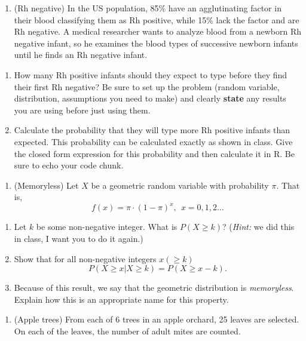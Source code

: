 \documentclass[
]{article}
\providecommand{\tightlist}{%
  \setlength{\itemsep}{0pt}\setlength{\parskip}{0pt}}
\begin{document}
\begin{enumerate}
\def\labelenumi{\arabic{enumi}.}
\setcounter{enumi}{1}
\tightlist
\item
  (Rh negative) In the US population, 85\% have an agglutinating factor
  in their blood classifying them as Rh positive, while 15\% lack the
  factor and are Rh negative. A medical researcher wants to analyze
  blood from a newborn Rh negative infant, so he examines the blood
  types of successive newborn infants until he finds an Rh negative
  infant.
\end{enumerate}

\begin{enumerate}
\def\labelenumi{\alph{enumi}.}
\item
  How many Rh positive infants should they expect to type before they
  find their first Rh negative? Be sure to set up the problem (random
  variable, distribution, assumptions you need to make) and clearly
  \textbf{state} any results you are using before just using them.
\item
  Calculate the probability that they will type more Rh positive infants
  than expected. This probability can be calculated exactly as shown in
  class. Give the closed form expression for this probability and then
  calculate it in R. Be sure to echo your code chunk.
\end{enumerate}

\begin{enumerate}
\def\labelenumi{\arabic{enumi}.}
\setcounter{enumi}{2}
\tightlist
\item
  (Memoryless) Let \(X\) be a geometric random variable with probability
  \(\pi\). That is,
  \[f(x) = \pi \cdot (1 - \pi)^{x}, \ \ x = 0, 1, 2 \dots\]
\end{enumerate}

\begin{enumerate}
\def\labelenumi{\alph{enumi}.}
\item
  Let \(k\) be some non-negative integer. What is \(P(X \geq k)\)?
  (\emph{Hint:} we did this in class, I want you to do it again.)
\item
  Show that for all non-negative integers \(x (\geq k)\)
  \[P(X \geq x | X \geq k) = P(X \geq x -k).\]
\item
  Because of this result, we say that the geometric distribution is
  \emph{memoryless}. Explain how this is an appropriate name for this
  property.
\end{enumerate}

\begin{enumerate}
\def\labelenumi{\arabic{enumi}.}
\setcounter{enumi}{3}
\tightlist
\item
  (Apple trees) From each of 6 trees in an apple orchard, 25 leaves are
  selected. On each of the leaves, the number of adult mites are
  counted.
\end{enumerate}
\end{document}

